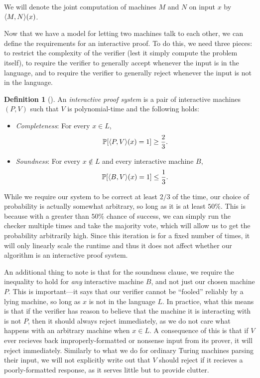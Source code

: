 \documentclass[english]{reedthesis}
\theoremstyle{plain}
\theoremstyle{definition}
\newtheorem{defn}[defn]{Definition}
\theoremstyle{remark}
\DeclarePairedDelimiter{\ang}{\langle}{\rangle}
\begin{document}

We will denote the joint computation of machines $M$ and $N$ on input $x$ by
$\ang{M, N}(x)$. %

Now that we have a model for letting two machines talk to each other, we can
define the requirements for an interactive proof. To do this, we need three
pieces: to restrict the complexity of the verifier (lest it simply compute the
problem itself), to require the verifier to generally accept whenever the input
is in the language, and to require the verifier to generally reject whenever the
input is not in the language.

\begin{defn}[{\cite[Def.\ 4.2.4]{Go01}}]\label{def:ips}
  An \emph{interactive proof system} is a pair of interactive machines $(P, V)$
  such that $V$ is polynomial-time and the following holds:
  \begin{itemize}
    \item \emph{Completeness}: For every $x \in L$,
          \[
            \mathbb{P}[\ang{P, V}(x) = 1] \ge \frac{2}{3}.
          \]
    \item \emph{Soundness}: For every $x \notin L$ and every interactive machine $B$,
          \[
            \mathbb{P}[\ang{B, V}(x) = 1] \le \frac{1}{3}.
          \]
  \end{itemize}
\end{defn}

While we require our system to be correct at least $2/3$ of the time, our choice
of probability is actually somewhat arbitrary, so long as it is at least $50\%$.
This is because with a greater than $50\%$ chance of success, we can simply run
the checker multiple times and take the majority vote, which will allow us to
get the probability arbitrarily high. Since this iteration is for a fixed number
of times, it will only linearly scale the runtime and thus it does not affect
whether our algorithm is an interactive proof system.

An additional thing to note is that for the soundness clause, we require the
inequality to hold for \emph{any} interactive machine $B$, and not just our
chosen machine $P$. This is important---it says that our verifier cannot be
``fooled'' reliably by a lying machine, so long as $x$ is not in the language
$L$. In practice, what this means is that if the verifier has reason to believe
that the machine it is interacting with is not $P$, then it should always reject
immediately, as we do not care what happens with an arbitrary machine when
$x \in L$. A consequence of this is that if $V$ ever recieves back
improperly-formatted or nonsense input from its prover, it will reject
immediately. Similarly to what we do for ordinary Turing machines parsing their
input, we will not explicitly write out that $V$ should reject if it recieves
a poorly-formatted response, as it serves little but to provide clutter.
\end{document}
